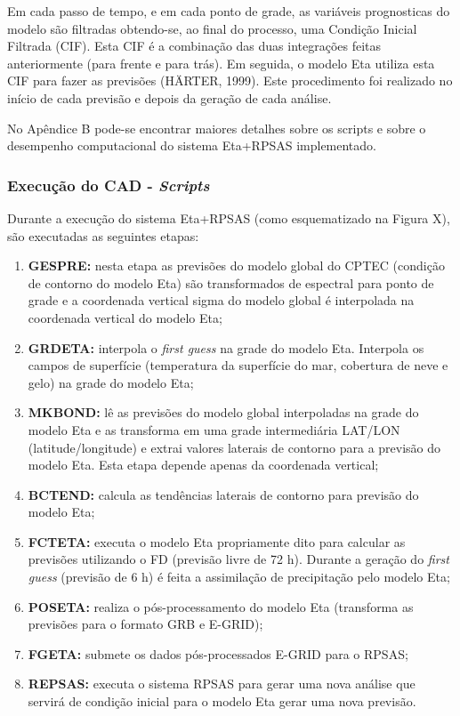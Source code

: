Em cada passo de tempo, e em cada ponto de grade, as variáveis prognosticas do modelo são filtradas obtendo-se, ao final do processo, uma Condição Inicial Filtrada (CIF). Esta CIF é a combinação das duas integrações feitas anteriormente (para frente e para trás). Em seguida, o modelo Eta utiliza esta CIF para fazer as previsões (HÄRTER, 1999). Este procedimento foi realizado no início de cada previsão e depois da geração de cada análise.

No Apêndice B pode-se encontrar maiores detalhes sobre os scripts e sobre o desempenho computacional do sistema Eta+RPSAS implementado.

\subsubsection{Execução do CAD - \textit{Scripts}}

Durante a execução do sistema Eta+RPSAS (como esquematizado na Figura X), são executadas as seguintes etapas:

\begin{enumerate}
\item \textbf{GESPRE:} nesta etapa as previsões do modelo global do CPTEC (condição de contorno do modelo Eta) são transformados de espectral para ponto de grade e a coordenada vertical sigma do modelo global é interpolada na coordenada vertical do modelo Eta;
\item \textbf{GRDETA:} interpola o \textit{first guess} na grade do modelo Eta. Interpola os campos de superfície (temperatura da superfície do mar, cobertura de neve e gelo) na grade do modelo Eta;
\item \textbf{MKBOND:} lê as previsões do modelo global interpoladas na grade do modelo Eta e as transforma em uma grade intermediária LAT/LON (latitude/longitude) e extrai valores laterais de contorno para a previsão do modelo Eta. Esta etapa depende apenas da coordenada vertical;
\item \textbf{BCTEND:} calcula as tendências laterais de contorno para previsão do modelo Eta;
\item \textbf{FCTETA:} executa o modelo Eta propriamente dito para calcular as previsões utilizando o FD (previsão livre de 72 h). Durante a geração do \textit{first guess} (previsão de 6 h) é feita a assimilação de precipitação pelo modelo Eta;
\item \textbf{POSETA:} realiza o pós-processamento do modelo Eta (transforma as previsões para o formato GRB e E-GRID);
\item \textbf{FGETA:}  submete os dados pós-processados E-GRID para o RPSAS;
\item \textbf{REPSAS:} executa o sistema RPSAS para gerar uma nova análise que servirá de condição inicial para o modelo Eta gerar uma nova previsão.
\end{enumerate}

